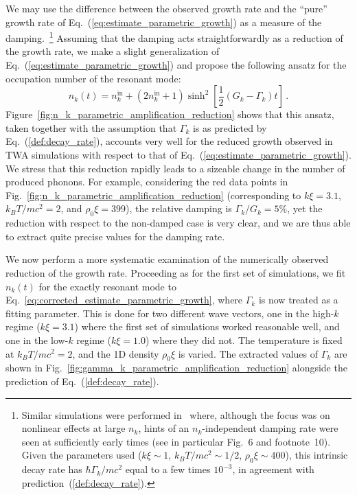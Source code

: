 \documentclass[aps,prd,notitlepage,amsfonts,amssymb,amsmath,nofootinbib,superscriptaddress,longbibliography]{revtex4-2}
\begin{document}
We may use the difference between the observed growth rate and the ``pure'' growth rate of Eq.~(\ref{eq:estimate_parametric_growth}) 
as a measure of the damping.~\footnote{Similar simulations were performed in~\cite{Robertson_2018} where, although the focus was on nonlinear effects at large $n_{k}$, hints of an $n_{k}$-independent damping rate were seen at sufficiently early times (see in particular Fig.~6 and footnote~10).  Given the parameters used ($k\xi \sim 1$, $k_{B}T/mc^{2} \sim 1/2$, $\rho_{0}\xi \sim 400$), this intrinsic decay rate has $\hbar\Gamma_{k}/mc^2$ equal to a few times $10^{-3}$, in agreement with prediction~(\ref{def:decay_rate}).}
Assuming that the damping acts straightforwardly as a reduction of the growth rate, we make a slight generalization of Eq.~(\ref{eq:estimate_parametric_growth}) and propose the following ansatz for the occupation number of the resonant mode:
\begin{equation}
\label{eq:corrected_estimate_parametric_growth}
    n_{k} (t) = n^{\mathrm{in}}_{k} + \left( 2 n^{\mathrm{in}}_{k} +1\right) \sinh^2 \left[ \frac{1}{2}  \left(G_{k} - \Gamma_{k}\right)  t  \right] \, .
\end{equation}
Figure~\ref{fig:n_k_parametric_amplification_reduction} shows that this ansatz, taken together with the assumption that $\Gamma_{k}$ is as predicted by Eq.~(\ref{def:decay_rate}), accounts very well for the reduced growth observed in TWA simulations with respect to that of Eq.~(\ref{eq:estimate_parametric_growth}). We stress that this reduction rapidly leads to a sizeable change in the number of produced phonons. 
For example, considering the red data points in Fig.~\ref{fig:n_k_parametric_amplification_reduction} (corresponding to $k\xi = 3.1$, $k_{B}T/mc^{2}=2$, and $\rho_0 \xi = 399$), the relative damping is $\Gamma_{k}/G_{k} = 5 \%$, yet the reduction with respect to the non-damped case is very clear, and we are thus able to extract quite precise values for the damping rate.

We now perform a more systematic examination of the numerically observed reduction of the growth rate.
Proceeding as for the first set of simulations, we fit $n_{k}(t)$ for the exactly resonant mode to Eq.~\eqref{eq:corrected_estimate_parametric_growth}, where $\Gamma_{k}$ is now treated as a fitting parameter. 
This is done for two different wave vectors, one in the high-$k$ regime ($k\xi = 3.1$) where the first set of simulations worked reasonable well, and one in the low-$k$ regime ($k\xi = 1.0$) where they did not.  The temperature is fixed at $k_{B}T/mc^{2} = 2$, and the 1D density $\rho_{0}\xi$ is varied.  The extracted values of $\Gamma_{k}$ are shown in Fig.~\ref{fig:gamma_k_parametric_amplification_reduction} alongside the prediction of Eq.~(\ref{def:decay_rate}).
\end{document}
